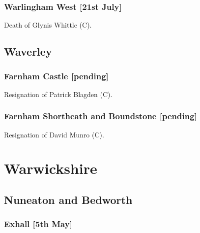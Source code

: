 \documentclass[a4paper,openany]{book}
\begin{document}
\begin{resultsiii}
\subsubsection*{Warlingham West \hspace*{\fill}\nolinebreak[1]%
\enspace\hspace*{\fill}
[21st July]}


Death of Glynis Whittle (C).

\subsection*{Waverley}

\subsubsection*{Farnham Castle \hspace*{\fill}\nolinebreak[1]%
\enspace\hspace*{\fill}
[pending]}


Resignation of Patrick Blagden (C).

\subsubsection*{Farnham Shortheath and Boundstone \hspace*{\fill}\nolinebreak[1]%
\enspace\hspace*{\fill}
[pending]}


Resignation of David Munro (C).

\section{Warwickshire}

\subsection*{Nuneaton and Bedworth}

\subsubsection*{Exhall \hspace*{\fill}\nolinebreak[1]%
\enspace\hspace*{\fill}
[5th May]}


\end{resultsiii}
\end{document}
